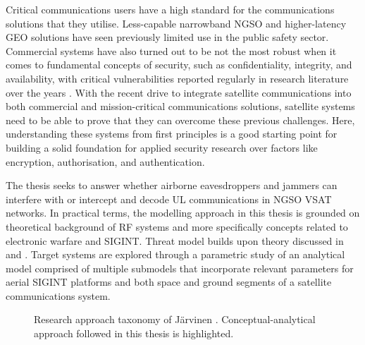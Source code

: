 \documentclass[english, 12pt, a4paper, elec, utf8, a-1b, online]{aaltothesis}
\begin{document}
Critical communications users have a high standard for the communications solutions that they utilise.
Less-capable narrowband NGSO and higher-latency GEO solutions have seen previously limited use in the public safety sector. Commercial systems have also turned out to be not the most robust when it comes to fundamental concepts of security, such as confidentiality, integrity, and availability, with critical vulnerabilities reported regularly in research literature over the years \cite{lin2022defending,pavur2020tale,santamarta2014wake,schia2023subsea}.
With the recent drive to integrate satellite communications into both commercial and mission-critical communications solutions, satellite systems need to be able to prove that they can overcome these previous challenges.
Here, understanding these systems from first principles is a good starting point for building a solid foundation for applied security research over factors like encryption, authorisation, and authentication.

The thesis seeks to answer whether airborne eavesdroppers and jammers can interfere with or intercept and decode UL communications in NGSO VSAT networks.
In practical terms, the modelling approach in this thesis is grounded on theoretical background of RF systems and more specifically concepts related to electronic warfare and SIGINT.
Threat model builds upon theory discussed in \cite{kosola2013digitaalinen} and \cite{wiley2006elint}.
Target systems are explored through a parametric study of an analytical model comprised of multiple submodels that incorporate relevant parameters for aerial SIGINT platforms and both space and ground segments of a satellite communications system.

\begin{figure}[h]
  \centering
  
  \caption{Research approach taxonomy of Järvinen \cite{jarvinen2011tutkimustyon, jarvinen2004research}. Conceptual-analytical approach followed in this thesis is highlighted.}
  \label{fig-research-taxonomy}
\end{figure}
\end{document}

